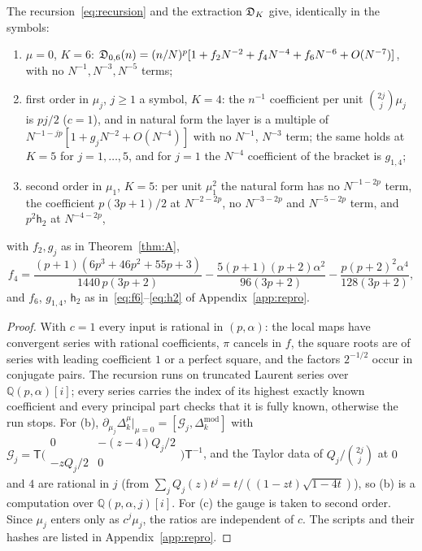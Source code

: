 \begin{lemma}\label{lem:N6d}
The recursion~\eqref{eq:recursion} and the extraction $\mathfrak D_K$ give, identically in the symbols:
\begin{enumerate}
\item[(a)] $\mu=0$, $K=6$: $\mathfrak D_{0,6}(n)=(n/N)^p[1+f_2N^{-2}+f_4N^{-4}+f_6N^{-6}+O(N^{-7})]$, with no $N^{-1},N^{-3},N^{-5}$ terms;
\item[(b)] first order in $\mu_j$, $j\ge1$ a symbol, $K=4$: the $n^{-1}$ coefficient per unit $\binom{2j}j\mu_j$ is $pj/2$ ($c=1$), and in
natural form the layer is a multiple of $N^{-1-jp}[1+g_jN^{-2}+O(N^{-4})]$ with no $N^{-1}$, $N^{-3}$ term; the same holds at $K=5$ for
$j=1,\dots,5$, and for $j=1$ the $N^{-4}$ coefficient of the bracket is $g_{1,4}$;
\item[(c)] second order in $\mu_1$, $K=5$: per unit $\mu_1^2$ the natural form has no $N^{-1-2p}$ term, the coefficient $p(3p+1)/2$ at
$N^{-2-2p}$, no $N^{-3-2p}$ and $N^{-5-2p}$ term, and $p^2\mathsf h_2$ at $N^{-4-2p}$,
\end{enumerate}
with $f_2,g_j$ as in Theorem~\ref{thm:A},
\begin{equation}\label{eq:f4}
  f_4=\frac{(p+1)(6p^3+46p^2+55p+3)}{1440\,p(3p+2)}-\frac{5(p+1)(p+2)\alpha^2}{96(3p+2)}-\frac{p(p+2)^2\alpha^4}{128(3p+2)},
\end{equation}
and $f_6$, $g_{1,4}$, $\mathsf h_2$ as in~\eqref{eq:f6}--\eqref{eq:h2} of Appendix~\ref{app:repro}.
\end{lemma}

\begin{proof}
With $c=1$ every input is rational in $(p,\alpha)$: the local maps have convergent series with rational coefficients, $\pi$ cancels in $f$,
the square roots are of series with leading coefficient $1$ or a perfect square, and the factors $2^{-1/2}$ occur in conjugate pairs. The
recursion runs on truncated Laurent series over $\mathbb Q(p,\alpha)[i]$; every series carries the index of its highest exactly known
coefficient and every principal part checks that it is fully known, otherwise the run stops. For (b), $\partial_{\mu_j}\Delta_k^\mu|_{\mu=0}=
[\mathcal G_j,\Delta_k^{\mathrm{mod}}]$ with $\mathcal G_j=\mathsf T\bigl(\begin{smallmatrix}0&-(z-4)Q_j/2\\-zQ_j/2&0\end{smallmatrix}\bigr)\mathsf T^{-1}$,
and the Taylor data of $Q_j/\binom{2j}j$ at $0$ and $4$ are rational in $j$ (from $\sum_jQ_j(z)t^j=t/((1-zt)\sqrt{1-4t})$), so (b) is a
computation over $\mathbb Q(p,\alpha,j)[i]$. For (c) the gauge is taken to second order. Since $\mu_j$ enters only as $c^j\mu_j$, the ratios are
independent of $c$. The scripts and their hashes are listed in Appendix~\ref{app:repro}.
\end{proof}

